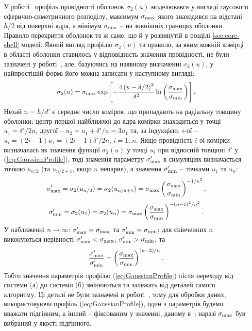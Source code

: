 \documentclass[14pt,twoside]{vakthesis}
\begin{document}
У роботі~\cite{Siekierski2006} профіль провідності оболонок $\sigma_2(u)$ моделювався у вигляді гаусового сферично-симетричного розподілу, максимум $\sigma_{\rm max}$ якого знаходився на відстані $h/2$ від поверхні ядра, а мінімум $\sigma_{\rm min}$ -- на зовнішніх границях оболонки. Правило перекриття оболонок те ж саме, що й у розвинутій в розділі \ref{sec:core-shell} моделі.  Явний вигляд профілю $\sigma_2(u)$ та правило, за яким кожній комірці в області оболонки ставилось у відповідність значення провідності, не були зазначені у роботі~\cite{Siekierski2006}, але, базуючись на наявному визначенні $\sigma_2(u)$, у найпростішій формі його можна записати у наступному вигляді:
\begin{equation}\label{eq:GaussianProfile}
\sigma_2(u)=\sigma_{\rm max} \exp
\left[-\frac{4\left(u-\delta/2\right)^2}{{\delta}^2}\ln\left(\frac{\sigma_{\rm
		max}}{\sigma_{\rm min}} \right)\right].
\end{equation}
Нехай $n = h/d'$ є середнє число комірок, що припадають на радіальну 
товщину оболонки; центр першої найближчої до ядра комірки знаходиться у точці $u_1 = \delta'/2n$, другої -- $u_2 = u_1 + \delta'/n = 3u_1$ та, за індукцією, $i$-ої -- $u_i = (2i - 1)u_1 = (2i - 1)\delta'/2n$,
$i = 1..n$. Якщо провідність $i$-ої комірки визначалась як значення функції $\sigma_2(u)$ у точці $u_i$ при відносній товщині $\delta'$ у (\ref{eq:GaussianProfile}), тоді значення параметру $\sigma'_{\rm max}$ в симуляціях \cite{Siekierski2006} визначається точкою $u_{n/2}$ (та $u_{n/2+1}$, якщо $n$ непарне), а значення $\sigma'_{\rm min}$ -- точками $u_1$ та $u_n$:
$$
\sigma'_{\rm max} = \sigma_2(u_{n/2})=\sigma_2(u_{n/2+1})=
\sigma_{\rm max}\left(\frac{ \sigma_{\rm max}}{
	\sigma_{\rm min}}\right)^{-1/n^2},
$$
$$
\sigma'_{\rm min} = \sigma_2(u_{1})=\sigma_2(u_{n})=
\sigma_{\rm max}\left(\frac{ \sigma_{\rm max}}{
	\sigma_{\rm min}}\right)^{-(n-1)^2/n^2}.
$$ 
У наближенні $n \to \infty$: $\sigma'_{\rm max} = \sigma_{\rm max}$ та
$\sigma'_{\rm min} = \sigma_{\rm min}$; для скінченних $n$ виконуються нерівності
$\sigma'_{\rm max} < \sigma_{\rm max}$, $\sigma'_{\rm min}
> \sigma_{\rm min}$, та
\begin{equation}\label{eq:sigma-maxmin-rel}
\frac{\sigma'_{\rm max}}{\sigma'_{\rm min}} = \left(\frac{ \sigma_{\rm max}}{
	\sigma_{\rm min}}\right)^{(n-2)/n}.
\end{equation}
Тобто значення параметрів профілю (\ref{eq:GaussianProfile}) після переходу від системи (а) до системи (б) змінюються та залежать від деталей самого алгоритму. Ці деталі не були зазначені в роботі~\cite{Siekierski2006}, тому для обробки даних, використовуючи профіль (\ref{eq:GaussianProfile}), один з параметрів будемо вважати підгінним, а інший -- фіксованим у значенні, даному в~\cite{Siekierski2006}; наразі $\sigma_{\rm max}$ був вибраний у якості підгінного.
\end{document}
